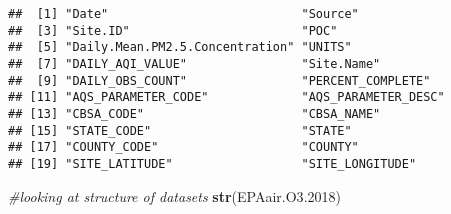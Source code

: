 \documentclass[]{article}
\newenvironment{Shaded}{\begin{snugshade}}{\end{snugshade}}
\newcommand{\CommentTok}[1]{\textcolor[rgb]{0.56,0.35,0.01}{\textit{#1}}}
\newcommand{\FloatTok}[1]{\textcolor[rgb]{0.00,0.00,0.81}{#1}}
\newcommand{\KeywordTok}[1]{\textcolor[rgb]{0.13,0.29,0.53}{\textbf{#1}}}
\newcommand{\NormalTok}[1]{#1}
\begin{document}
\begin{verbatim}
##  [1] "Date"                           "Source"                        
##  [3] "Site.ID"                        "POC"                           
##  [5] "Daily.Mean.PM2.5.Concentration" "UNITS"                         
##  [7] "DAILY_AQI_VALUE"                "Site.Name"                     
##  [9] "DAILY_OBS_COUNT"                "PERCENT_COMPLETE"              
## [11] "AQS_PARAMETER_CODE"             "AQS_PARAMETER_DESC"            
## [13] "CBSA_CODE"                      "CBSA_NAME"                     
## [15] "STATE_CODE"                     "STATE"                         
## [17] "COUNTY_CODE"                    "COUNTY"                        
## [19] "SITE_LATITUDE"                  "SITE_LONGITUDE"
\end{verbatim}

\begin{Shaded}
\begin{Highlighting}[]
\CommentTok{#looking at structure of datasets}
\KeywordTok{str}\NormalTok{(EPAair.O3}\FloatTok{.2018}\NormalTok{)}
\end{Highlighting}
\end{Shaded}
\end{document}
